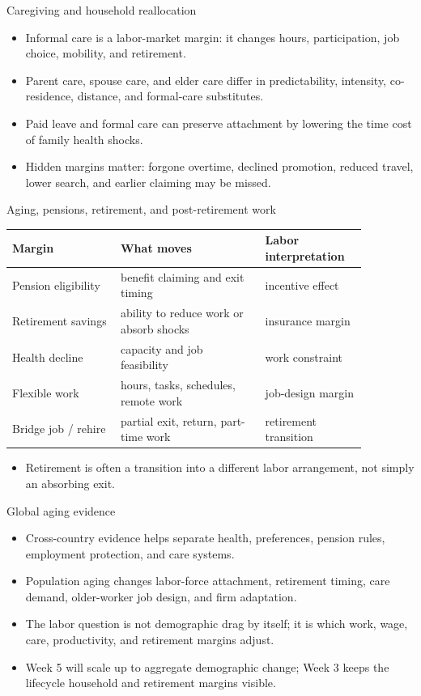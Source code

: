 \documentclass[aspectratio=169,11pt]{beamer}
\begin{document}
\begin{frame}{Caregiving and household reallocation}
\begin{itemize}
    \item Informal care is a labor-market margin: it changes hours, participation, job choice, mobility, and retirement.
    \item Parent care, spouse care, and elder care differ in predictability, intensity, co-residence, distance, and formal-care substitutes.
    \item Paid leave and formal care can preserve attachment by lowering the time cost of family health shocks.
    \item Hidden margins matter: forgone overtime, declined promotion, reduced travel, lower search, and earlier claiming may be missed.
\end{itemize}
\end{frame}

\begin{frame}{Aging, pensions, retirement, and post-retirement work}
\small
\begin{tabular}{p{0.27\linewidth} p{0.36\linewidth} p{0.24\linewidth}}
\toprule
Margin & What moves & Labor interpretation \\
\midrule
Pension eligibility & benefit claiming and exit timing & incentive effect \\
Retirement savings & ability to reduce work or absorb shocks & insurance margin \\
Health decline & capacity and job feasibility & work constraint \\
Flexible work & hours, tasks, schedules, remote work & job-design margin \\
Bridge job / rehire & partial exit, return, part-time work & retirement transition \\
\bottomrule
\end{tabular}
\vspace{0.3cm}
\begin{itemize}
    \item Retirement is often a transition into a different labor arrangement, not simply an absorbing exit.
\end{itemize}
\end{frame}

\begin{frame}{Global aging evidence}
\begin{itemize}
    \item Cross-country evidence helps separate health, preferences, pension rules, employment protection, and care systems.
    \item Population aging changes labor-force attachment, retirement timing, care demand, older-worker job design, and firm adaptation.
    \item The labor question is not demographic drag by itself; it is which work, wage, care, productivity, and retirement margins adjust.
    \item Week 5 will scale up to aggregate demographic change; Week 3 keeps the lifecycle household and retirement margins visible.
\end{itemize}
\end{frame}
\end{document}
